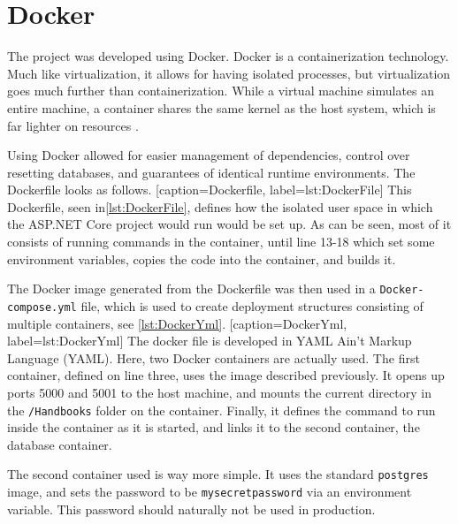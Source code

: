 \section{Docker}
The project was developed using Docker.
Docker is a containerization technology.
Much like virtualization, it allows for having isolated processes, but virtualization goes much further than containerization.
While a virtual machine simulates an entire machine, a container shares the same kernel as the host system, which is far lighter on resources \cite{docker}.

Using Docker allowed for easier management of dependencies, control over resetting databases, and guarantees of identical runtime environments.
The Dockerfile looks as follows.
[caption={Dockerfile}, label={lst:DockerFile}]
This Dockerfile, seen in\cref{lst:DockerFile}, defines how the isolated user space in which the ASP.NET Core project would run would be set up.
As can be seen, most of it consists of running commands in the container, until line 13-18 which set some environment variables, copies the code into the container, and builds it.

The Docker image generated from the Dockerfile was then used in a \texttt{Docker-compose.yml} file, which is used to create deployment structures consisting of multiple containers, see \cref{lst:DockerYml}.
[caption={DockerYml}, label={lst:DockerYml}]
The docker file is developed in YAML Ain't Markup Language (YAML).
Here, two Docker containers are actually used.
The first container, defined on line three, uses the image described previously.
It opens up ports 5000 and 5001 to the host machine, and mounts the current directory in the \texttt{/Handbooks} folder on the container.
Finally, it defines the command to run inside the container as it is started, and links it to the second container, the database container.

The second container used is way more simple.
It uses the standard \texttt{postgres} image, and sets the password to be \texttt{mysecretpassword} via an environment variable.
This password should naturally not be used in production.
